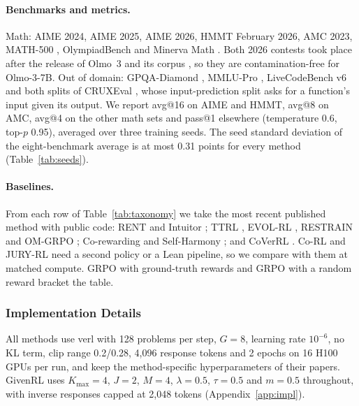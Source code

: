 \documentclass[11pt]{article}
\theoremstyle{remark}
\newcommand{\method}{GivenRL\xspace}
\newcommand{\Kmax}{K_{\max}}
\begin{document}
\paragraph{Benchmarks and metrics.}
Math: AIME 2024, AIME 2025, AIME 2026, HMMT February 2026, AMC 2023, MATH-500 \citep{hendrycks2021math,lightman2024verify}, OlympiadBench \citep{he2024olympiadbench} and Minerva Math \citep{lewkowycz2022minerva}. Both 2026 contests took place after the release of Olmo~3 and its corpus \citep{balunovic2025matharena}, so they are contamination-free for Olmo-3-7B. Out of domain: GPQA-Diamond \citep{rein2024gpqa}, MMLU-Pro \citep{wang2024mmlupro}, LiveCodeBench v6 \citep{jain2025livecodebench} and both splits of CRUXEval \citep{gu2024cruxeval}, whose input-prediction split asks for a function's input given its output. We report avg@16 on AIME and HMMT, avg@8 on AMC, avg@4 on the other math sets and pass@1 elsewhere (temperature 0.6, top-$p$ 0.95), averaged over three training seeds. The seed standard deviation of the eight-benchmark average is at most 0.31 points for every method (Table~\ref{tab:seeds}).

\paragraph{Baselines.}
From each row of Table~\ref{tab:taxonomy} we take the most recent published method with public code: RENT \citep{prabhudesai2025rent} and Intuitor \citep{zhao2026intuitor}; TTRL \citep{zuo2025ttrl}, EVOL-RL \citep{zhou2025evolrl}, RESTRAIN \citep{yu2026restrain} and OM-GRPO \citep{ye2026omgrpo}; Co-rewarding \citep{zhang2026corewarding} and Self-Harmony \citep{wang2026selfharmony}; and CoVerRL \citep{pan2026coverrl}. Co-RL \citep{yang2026corl} and JURY-RL \citep{chen2026juryrl} need a second policy or a Lean pipeline, so we compare with them at matched compute. GRPO with ground-truth rewards and GRPO with a random reward \citep{shao2026spurious} bracket the table.

\subsubsection{Implementation Details}

All methods use verl \citep{sheng2025hybridflow} with 128 problems per step, $G=8$, learning rate $10^{-6}$, no KL term, clip range 0.2/0.28, 4,096 response tokens and 2 epochs on 16 H100 GPUs per run, and keep the method-specific hyperparameters of their papers. \method uses $\Kmax=4$, $J=2$, $M=4$, $\lambda=0.5$, $\tau=0.5$ and $m=0.5$ throughout, with inverse responses capped at 2,048 tokens (Appendix~\ref{app:impl}).
\end{document}
